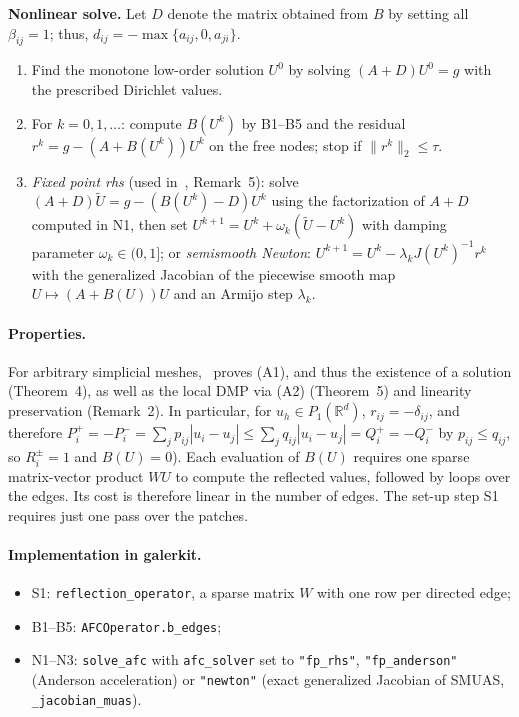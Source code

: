 \documentclass[11pt]{article}
\newcommand{\R}{\mathbb{R}}
\begin{document}
\begin{framed}
\noindent\textbf{Nonlinear solve.} Let $D$ denote the matrix obtained from $B$ by setting all $\beta_{ij}=1$;
thus, $d_{ij}=-\max\{a_{ij},0,a_{ji}\}$.
\begin{enumerate}[label=N\arabic*., leftmargin=*, itemsep=2pt]
\item Find the monotone low-order solution $U^0$ by solving $(A+D)U^0=g$ with the prescribed Dirichlet values.
\item For $k=0,1,\dots$: compute $B(U^k)$ by B1--B5 and the residual
  $r^k=g-(A+B(U^k))U^k$ on the free nodes; stop if $\|r^k\|_2\le\tau$.
\item \emph{Fixed point rhs} (used in~\cite{Kn23}, Remark~5): solve
  $(A+D)\tilde U=g-(B(U^k)-D)U^k$ using the factorization of $A+D$ computed in N1, then set
  $U^{k+1}=U^k+\omega_k(\tilde U-U^k)$ with damping parameter $\omega_k\in(0,1]$; or
  \emph{semismooth Newton}: $U^{k+1}=U^k-\lambda_k J(U^k)^{-1}r^k$ with the generalized Jacobian of the piecewise
  smooth map $U\mapsto(A+B(U))U$ and an Armijo step $\lambda_k$.
\end{enumerate}
\end{framed}

\paragraph{Properties.} For arbitrary simplicial meshes,~\cite{Kn23} proves (A1), and thus the existence of a
solution (Theorem~4), as well as the local DMP via (A2) (Theorem~5) and linearity preservation (Remark~2). In
particular, for $u_h\in P_1(\R^d)$, $r_{ij}=-\delta_{ij}$, and therefore
$P_i^+=-P_i^-=\sum_j p_{ij}|u_i-u_j|\le\sum_j q_{ij}|u_i-u_j|=Q_i^+=-Q_i^-$ by $p_{ij}\le q_{ij}$, so $R_i^\pm=1$ and
$B(U)=0$).
Each evaluation of $B(U)$ requires one sparse matrix-vector product $WU$ to compute the reflected values, followed
by loops over the edges. Its cost is therefore linear in the number of edges. The set-up step S1 requires just one
pass over the patches.

\paragraph{Implementation in galerkit.}
\begin{itemize}[leftmargin=*, itemsep=1pt]
\item S1: \texttt{reflection\_operator}, a sparse matrix $W$ with one row per directed edge;
\item B1--B5: \texttt{AFCOperator.b\_edges};
\item N1--N3: \texttt{solve\_afc} with \texttt{afc\_solver} set to \texttt{"fp\_rhs"}, \texttt{"fp\_anderson"}
  (Anderson acceleration) or \texttt{"newton"} (exact generalized Jacobian of SMUAS, \texttt{\_jacobian\_muas}).
\end{itemize}
\end{document}
